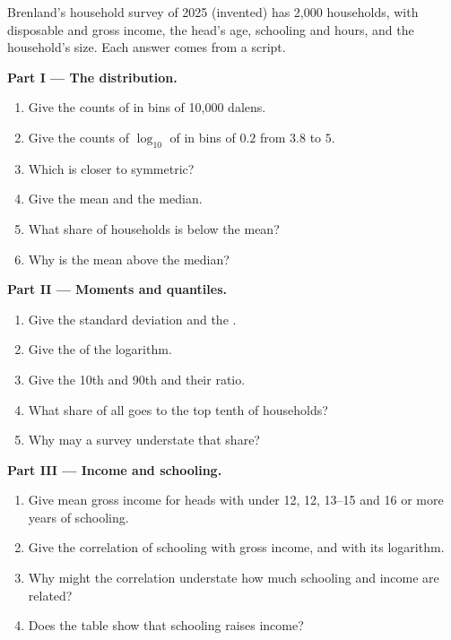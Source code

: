 \begin{problem}\label{pb:b1:describing-data:survey}
Brenland's household survey of 2025 (invented) has 2,000 households, with
disposable and gross income, the head's age, schooling and hours, and the
household's size. Each answer comes from a script.

\medskip\noindent\textbf{Part I --- The distribution.}
\begin{enumerate}
  \item Give the counts of  in bins of 10,000 dalens.
  \item Give the counts of $\log_{10}$ of  in bins of $0.2$ from $3.8$ to $5$.
  \item Which  is closer to symmetric?
  \item Give the mean and the median.
  \item What share of households is below the mean?
  \item Why is the mean above the median?
\end{enumerate}

\medskip\noindent\textbf{Part II --- Moments and quantiles.}
\begin{enumerate}[resume]
  \item Give the standard deviation and the .
  \item Give the  of the logarithm.
  \item Give the 10th and 90th  and their ratio.
  \item What share of all  goes to the top tenth of households?
  \item Why may a survey understate that share?
\end{enumerate}

\medskip\noindent\textbf{Part III --- Income and schooling.}
\begin{enumerate}[resume]
  \item Give mean gross income for heads with under 12, 12, 13--15 and 16 or
    more years of schooling.
  \item Give the correlation of schooling with gross income, and with its
    logarithm.
  \item Why might the correlation understate how much schooling and income
    are related?
  \item Does the table show that schooling raises income?
\end{enumerate}


\end{problem}
